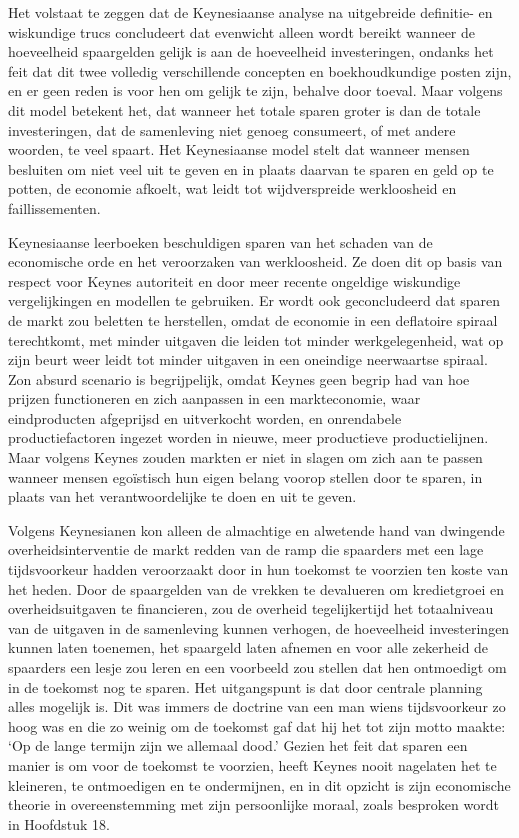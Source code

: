\documentclass[
  a5paper,
  smalldemyvopaper,11pt,twoside,onecolumn,openright,extrafontsizes,
hidelinks]{memoir}
\begin{document}
Het volstaat te zeggen dat de Keynesiaanse analyse na uitgebreide
definitie- en wiskundige trucs concludeert dat evenwicht alleen wordt
bereikt wanneer de hoeveelheid spaargelden gelijk is aan de hoeveelheid
investeringen, ondanks het feit dat dit twee volledig verschillende
concepten en boekhoudkundige posten zijn, en er geen reden is voor hen
om gelijk te zijn, behalve door toeval. Maar volgens dit model betekent
het, dat wanneer het totale sparen groter is dan de totale
investeringen, dat de samenleving niet genoeg consumeert, of met andere
woorden, te veel spaart. Het Keynesiaanse model stelt dat wanneer mensen
besluiten om niet veel uit te geven en in plaats daarvan te sparen en
geld op te potten, de economie afkoelt, wat leidt tot wijdverspreide
werkloosheid en faillissementen.

Keynesiaanse leerboeken beschuldigen sparen van het schaden van de
economische orde en het veroorzaken van werkloosheid. Ze doen dit op
basis van respect voor Keynes autoriteit en door meer recente ongeldige
wiskundige vergelijkingen en modellen te gebruiken. Er wordt ook
geconcludeerd dat sparen de markt zou beletten te herstellen, omdat de
economie in een deflatoire spiraal terechtkomt, met minder uitgaven die
leiden tot minder werkgelegenheid, wat op zijn beurt weer leidt tot
minder uitgaven in een oneindige neerwaartse spiraal. Zon absurd
scenario is begrijpelijk, omdat Keynes geen begrip had van hoe prijzen
functioneren en zich aanpassen in een markteconomie, waar eindproducten
afgeprijsd en uitverkocht worden, en onrendabele productiefactoren
ingezet worden in nieuwe, meer productieve productielijnen. Maar volgens
Keynes zouden markten er niet in slagen om zich aan te passen wanneer
mensen egoïstisch hun eigen belang voorop stellen door te sparen, in
plaats van het verantwoordelijke te doen en uit te geven.

Volgens Keynesianen kon alleen de almachtige en alwetende hand van
dwingende overheidsinterventie de markt redden van de ramp die spaarders
met een lage tijdsvoorkeur hadden veroorzaakt door in hun toekomst te
voorzien ten koste van het heden. Door de spaargelden van de vrekken te
devalueren om kredietgroei en overheidsuitgaven te financieren, zou de
overheid tegelijkertijd het totaalniveau van de uitgaven in de
samenleving kunnen verhogen, de hoeveelheid investeringen kunnen laten
toenemen, het spaargeld laten afnemen en voor alle zekerheid de
spaarders een lesje zou leren en een voorbeeld zou stellen dat hen
ontmoedigt om in de toekomst nog te sparen. Het uitgangspunt is dat door
centrale planning alles mogelijk is. Dit was immers de doctrine van een
man wiens tijdsvoorkeur zo hoog was en die zo weinig om de toekomst gaf
dat hij het tot zijn motto maakte: `Op de lange termijn zijn we allemaal
dood.' Gezien het feit dat sparen een manier is om voor de toekomst te
voorzien, heeft Keynes nooit nagelaten het te kleineren, te ontmoedigen
en te ondermijnen, en in dit opzicht is zijn economische theorie in
overeenstemming met zijn persoonlijke moraal, zoals besproken wordt in
Hoofdstuk 18.
\end{document}
